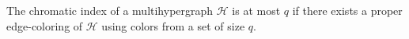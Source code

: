 \begin{definition}
The chromatic index of a multihypergraph $\mathcal H$ is at most $q$ if
there exists a proper edge-coloring of $\mathcal H$ using colors from a
set of size $q$.
\end{definition}
